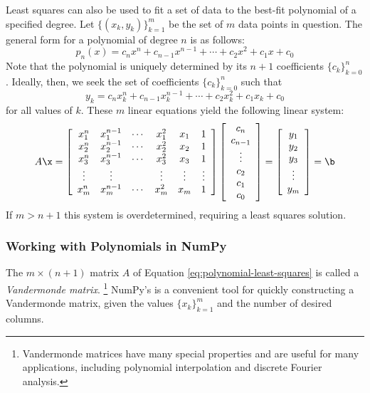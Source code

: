 Least squares can also be used to fit a set of data to the best-fit polynomial of a specified degree.
Let $\{(x_k, y_k)\}_{k=1}^m$ be the set of $m$ data points in question.
The general form for a polynomial of degree $n$ is as follows:
\[
p_n(x) = c_n x^n + c_{n-1} x^{n-1} + \cdots + c_2 x^2 + c_1 x + c_0
\]
Note that the polynomial is uniquely determined by its $n+1$ coefficients $\{c_k\}_{k=0}^n$.
Ideally, then, we seek the set of coefficients $\{c_k\}_{k=0}^n$ such that
\[
y_k = c_n x_k^n + c_{n-1} x_k^{n-1} + \cdots + c_2 x_k^2 + c_1 x_k + c_0
\]
for all values of $k$.
These $m$ linear equations yield the following linear system:
\begin{equation}
A\x =
\left[\begin{array}{cccccc}
x_1^n & x_1^{n-1} & \cdots & x_1^2 & x_1 & 1 \\
x_2^n & x_2^{n-1} & \cdots & x_2^2 & x_2 & 1 \\
x_3^n & x_3^{n-1} & \cdots & x_3^2 & x_3 & 1 \\
\vdots & \vdots & & \vdots & \vdots & \vdots \\
x_m^n & x_m^{n-1} & \cdots & x_m^2 & x_m & 1 \\
\end{array}\right]
\left[\begin{array}{c}
c_n \\ c_{n-1} \\ \vdots \\ c_2 \\ c_1 \\ c_0
\end{array}\right]
=
\left[\begin{array}{c} y_1 \\ y_2 \\ y_3 \\ \vdots \\ y_m \end{array}\right]
= \b
\label{eq:polynomial-least-squares}
\end{equation}
%
If $m > n+1$ this system is overdetermined, requiring a least squares solution.

\subsubsection*{Working with Polynomials in NumPy} %

The $m \times (n+1)$ matrix $A$ of Equation \ref{eq:polynomial-least-squares} is called a \emph{Vandermonde matrix}.%
\footnote{Vandermonde matrices have many special properties and are useful for many applications, including polynomial interpolation and discrete Fourier analysis.}
NumPy's  is a convenient tool for quickly constructing a Vandermonde matrix, given the values $\{x_k\}_{k=1}^m$ and the number of desired columns.

